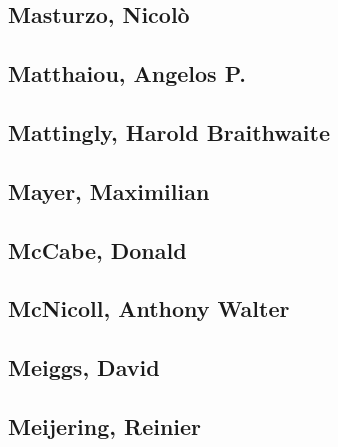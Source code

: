 
\subsection[Masturzo, Nicolò (2)]{Masturzo, Nicolò}


\subsection[Matthaiou, Angelos P. (1)]{Matthaiou, Angelos P.}

\subsection[Mattingly, Harold Braithwaite (1)]{Mattingly, Harold Braithwaite}

\subsection[Mayer, Maximilian (1)]{Mayer, Maximilian}

\subsection[McCabe, Donald (1)]{McCabe, Donald}

\subsection[McNicoll, Anthony Walter (1)]{McNicoll, Anthony Walter}

\subsection[Meiggs, David (1)]{Meiggs, David}

\subsection[Meijering, Reinier (1)]{Meijering, Reinier}

